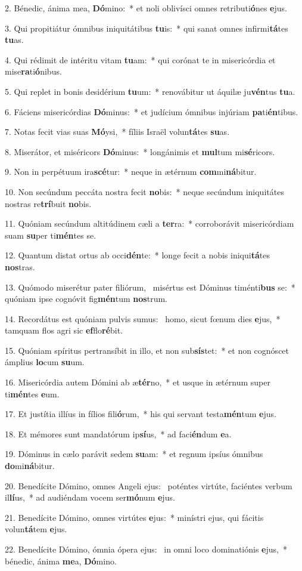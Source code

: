 2. Bénedic, ánima mea, \textbf{Dó}mino:~*  et noli oblivísci omnes retributi\textbf{ó}nes \textbf{e}jus.\

3. Qui propitiátur ómnibus iniquitátibus \textbf{tu}is:~*  qui sanat omnes infirmi\textbf{tá}tes \textbf{tu}as.\

4. Qui rédimit de intéritu vitam \textbf{tu}am:~*  qui corónat te in misericórdia et mise\textbf{ra}ti\textbf{ó}nibus.\

5. Qui replet in bonis desidérium \textbf{tu}um:~*  renovábitur ut áquilæ ju\textbf{vén}tus \textbf{tu}a.\

6. Fáciens misericórdias \textbf{Dó}minus:~*  et judícium ómnibus injúriam \textbf{pa}ti\textbf{én}tibus.\

7. Notas fecit vias suas \textbf{Mó}ysi,~*  fíliis Israël volun\textbf{tá}tes \textbf{su}as.\

8. Miserátor, et miséricors \textbf{Dó}minus:~*  longánimis et \textbf{mul}tum mi\textbf{sé}ricors.\

9. Non in perpétuum ira\textbf{scé}tur:~*  neque in ætérnum \textbf{com}mi\textbf{ná}bitur.\

10. Non secúndum peccáta nostra fecit \textbf{no}bis:~*  neque secúndum iniquitátes nostras re\textbf{trí}buit \textbf{no}bis.\

11. Quóniam secúndum altitúdinem cæli a \textbf{ter}ra:~*  corroborávit misericórdiam suam \textbf{su}per ti\textbf{mén}tes se.\

12. Quantum distat ortus ab occi\textbf{dén}te:~*  longe fecit a nobis iniqui\textbf{tá}tes \textbf{nos}tras.\

13. Quómodo miserétur pater filiórum, \dag\  misértus est Dóminus timénti\textbf{bus} se:~*  quóniam ipse cognóvit fig\textbf{mén}tum \textbf{nos}trum.\

14. Recordátus est quóniam pulvis sumus: \dag\  homo, sicut fœnum dies \textbf{e}jus,~*  tamquam flos agri sic \textbf{ef}flo\textbf{ré}bit.\

15. Quóniam spíritus pertransíbit in illo, et non sub\textbf{sís}tet:~*  et non cognóscet ámplius \textbf{lo}cum \textbf{su}um.\

16. Misericórdia autem Dómini ab æ\textbf{tér}no,~*  et usque in ætérnum super ti\textbf{mén}tes \textbf{e}um.\

17. Et justítia illíus in fílios fili\textbf{ó}rum,~*  his qui servant testa\textbf{mén}tum \textbf{e}jus.\

18. Et mémores sunt mandatórum ip\textbf{sí}us,~*  ad faci\textbf{én}dum \textbf{e}a.\

19. Dóminus in cælo parávit sedem \textbf{su}am:~*  et regnum ipsíus ómnibus \textbf{do}mi\textbf{ná}bitur.\

20. Benedícite Dómino, omnes Angeli ejus: \dag\  poténtes virtúte, faciéntes verbum il\textbf{lí}us,~*  ad audiéndam vocem ser\textbf{mó}num \textbf{e}jus.\

21. Benedícite Dómino, omnes virtútes \textbf{e}jus:~*  minístri ejus, qui fácitis volun\textbf{tá}tem \textbf{e}jus.\

22. Benedícite Dómino, ómnia ópera ejus: \dag\  in omni loco dominatiónis \textbf{e}jus,~*  bénedic, ánima \textbf{me}a, \textbf{Dó}mino.\

